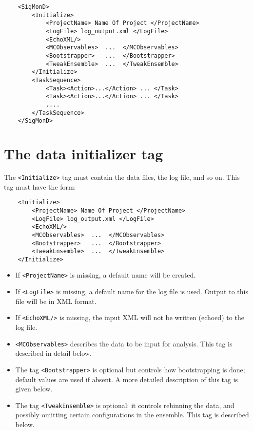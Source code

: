 \documentclass[12pt,notitlepage,letterpaper]{article}
\newcommand{\vb}{\texttt}
\begin{document}
\begin{verbatim}
    <SigMonD>
        <Initialize>
            <ProjectName> Name Of Project </ProjectName>
            <LogFile> log_output.xml </LogFile>
            <EchoXML/>
            <MCObservables>  ...  </MCObservables>
            <Bootstrapper>   ...  </Bootstrapper>
            <TweakEnsemble>  ...  </TweakEnsemble>
        </Initialize>
        <TaskSequence>
            <Task><Action>...</Action> ... </Task>
            <Task><Action>...</Action> ... </Task>
            .... 
        </TaskSequence>
    </SigMonD>
\end{verbatim}

\section{The data initializer tag}
The \vb{<Initialize>} tag must contain the data files, the log file, and so on. 
This tag must have the form:
\begin{verbatim}
    <Initialize>
        <ProjectName> Name Of Project </ProjectName>
        <LogFile> log_output.xml </LogFile>
        <EchoXML/>
        <MCObservables>  ...  </MCObservables>
        <Bootstrapper>   ...  </Bootstrapper>
        <TweakEnsemble>  ...  </TweakEnsemble>
    </Initialize>
\end{verbatim}
\begin{itemize} 
\item                                                 
 If \vb{<ProjectName>} is missing, a default name will be created.
\item                                                                   
 If \vb{<LogFile>} is missing, a default name for the log file is used. 
Output to this file will be in XML format.
\item                                                              
 If \vb{<EchoXML/>} is missing, the input XML will not be written (echoed)
 to the log file.                                                          
\item                                                                   
 \vb{<MCObservables>} describes the data to be input for analysis. This
 tag is described in detail below.       
\item                                                                   
 The tag \vb{<Bootstrapper>} is optional but controls how bootstrapping 
     is done; default values are used if absent.  A more detailed 
 description of this tag is given below.    
\item                                                                   
 The tag \vb{<TweakEnsemble>} is optional: it controls rebinning the    
     data, and possibly omitting certain configurations in the          
     ensemble.  This tag is described below.  
\end{itemize}                                                                    
\end{document}
